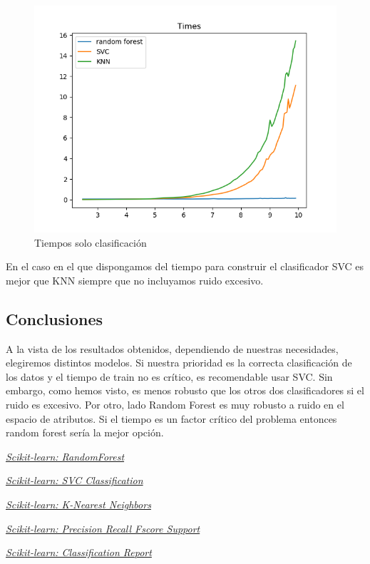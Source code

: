 \documentclass[8pt,a4paper]{{esannV2}}
\begin{document}
\begin{figure}[htbp]
\centering
    \includegraphics[scale=0.5]{./TiemposSoloClasificacion.png}
    \caption{Tiempos solo clasificación}
\end{figure}

En el caso en el que dispongamos del tiempo para construir el clasificador SVC es mejor que KNN siempre que no incluyamos ruido excesivo.


\subsection{Conclusiones}
A la vista de los resultados obtenidos, dependiendo de nuestras necesidades, elegiremos distintos modelos. Si nuestra prioridad es la correcta clasificación de los datos y el tiempo de train no es crítico, es recomendable usar SVC. Sin embargo, como hemos visto, es menos robusto que los otros dos clasificadores si el ruido es excesivo. Por otro, lado Random Forest es muy robusto a ruido en el  espacio de atributos. Si el tiempo es un factor crítico del problema entonces random forest sería la mejor opción.


\begin{thebibliography}{99}


\emph{\href{https://scikit-learn.org/stable/modules/generated/sklearn.ensemble.RandomForestClassifier.html}{Scikit-learn: RandomForest}}


\emph{\href{https://scikit-learn.org/stable/modules/generated/sklearn.svm.SVC.html}{Scikit-learn: SVC Classification}}

\emph{\href{https://scikit-learn.org/stable/modules/neighbors.html}{Scikit-learn: K-Nearest Neighbors}}

\emph{\href{https://scikit-learn.org/stable/modules/neighbors.html}{Scikit-learn: Precision Recall Fscore Support}}

\emph{\href{https://scikit-learn.org/stable/modules/neighbors.html}{Scikit-learn: Classification Report}}
\end{thebibliography}
\end{document}
